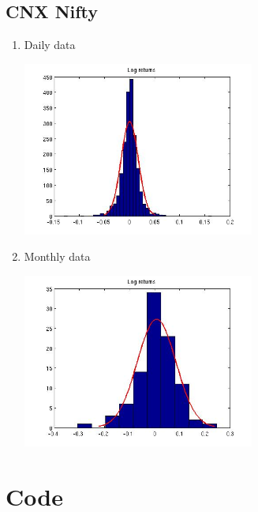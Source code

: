 \documentclass[12pt]{article}
\begin{document}
  \subsection*{CNX Nifty}
  \begin{enumerate}
    \item Daily data
      \begin{center}
        \includegraphics[width=3in]{niftydailylr.jpg}
      \end{center}
    \item Monthly data
      \begin{center}
        \includegraphics[width=3in]{niftymonthlylr.jpg}
      \end{center}
  \end{enumerate}

\newpage
\section{Code}
  
\end{document}
